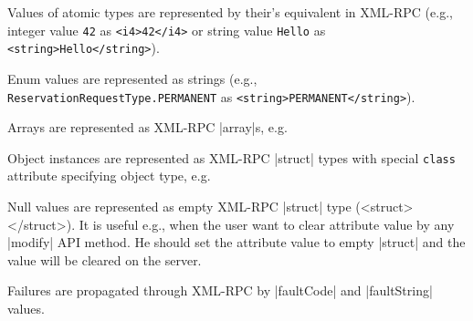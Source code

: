 \documentclass[a4paper]{report}
\newcommand{\ApiValue}[1]{\verb|#1|}
\begin{document}
\begin{compactitem}

\item Values of atomic types are represented by their's equivalent in XML-RPC (e.g., integer value \ApiValue{42} as \ApiValue{<i4>42</i4>} or string value \ApiValue{Hello} as \ApiValue{<string>Hello</string>}).

\item Enum values are represented as strings (e.g., \ApiValue{ReservationRequestType.PERMANENT} as \ApiValue{<string>PERMANENT</string>}).

\item Arrays are represented as XML-RPC |array|s, e.g.
\begin{parcolumns}[nofirstindent=true, colwidths={1=.36\textwidth}]{3}%
\vspace{-3.5mm}\colchunk{%
\footnotesize\begin{verbatim}
[101, 202]
\end{verbatim}
\flushright as
}%
\end{parcolumns}\vspace{1mm}

\item Object instances are represented as XML-RPC |struct| types with special \ApiValue{class} attribute specifying object type, e.g.%
\begin{parcolumns}[nofirstindent=true, colwidths={1=.36\textwidth}]{3}%
\vspace{-3.5mm}\colchunk{%
\footnotesize\begin{verbatim}
Person {
  name: "Martin Srom",
  email: "srom@cesnet.cz"
}
\end{verbatim}
\flushright as
}%
\end{parcolumns}\vspace{1mm}

\item Null values are represented as empty XML-RPC |struct| type (<struct></struct>). It is useful e.g., when the user want to clear attribute value by any |modify| API method. He should set the attribute value to empty |struct| and the value will be cleared on the server.

\item Failures are propagated through XML-RPC by |faultCode| and |faultString| values.

\end{compactitem}
\end{document}
